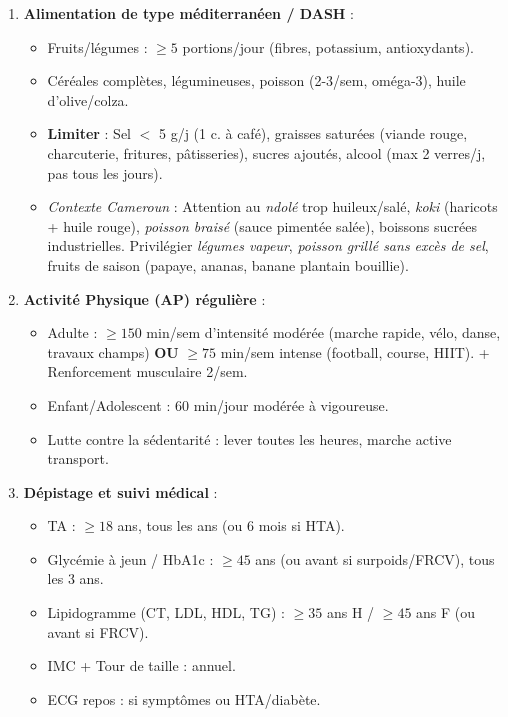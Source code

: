 \documentclass[11pt]{article}
\begin{document}
\begin{propriete}
\begin{enumerate}
    \item \textbf{Alimentation de type méditerranéen / DASH} :
    \begin{itemize}
        \item Fruits/légumes : $\ge 5$ portions/jour (fibres, potassium, antioxydants).
        \item Céréales complètes, légumineuses, poisson (2-3/sem, oméga-3), huile d'olive/colza.
        \item \textbf{Limiter} : Sel $<$ 5 g/j (1 c. à café), graisses saturées (viande rouge, charcuterie, fritures, pâtisseries), sucres ajoutés, alcool (max 2 verres/j, pas tous les jours).
        \item \emph{Contexte Cameroun} : Attention au \emph{ndolé} trop huileux/salé, \emph{koki} (haricots + huile rouge), \emph{poisson braisé} (sauce pimentée salée), boissons sucrées industrielles. Privilégier \emph{légumes vapeur}, \emph{poisson grillé sans excès de sel}, fruits de saison (papaye, ananas, banane plantain bouillie).
    \end{itemize}
    \item \textbf{Activité Physique (AP) régulière} :
    \begin{itemize}
        \item Adulte : $\ge 150$ min/sem d'intensité modérée (marche rapide, vélo, danse, travaux champs) \textbf{OU} $\ge 75$ min/sem intense (football, course, HIIT). + Renforcement musculaire 2/sem.
        \item Enfant/Adolescent : 60 min/jour modérée à vigoureuse.
        \item Lutte contre la sédentarité : lever toutes les heures, marche active transport.
    \end{itemize}
    \item \textbf{Dépistage et suivi médical} :
    \begin{itemize}
        \item TA : $\ge 18$ ans, tous les ans (ou 6 mois si HTA).
        \item Glycémie à jeun / HbA1c : $\ge 45$ ans (ou avant si surpoids/FRCV), tous les 3 ans.
        \item Lipidogramme (CT, LDL, HDL, TG) : $\ge 35$ ans H / $\ge 45$ ans F (ou avant si FRCV).
        \item IMC + Tour de taille : annuel.
        \item ECG repos : si symptômes ou HTA/diabète.
    \end{itemize}
\end{enumerate}
\end{propriete}
\end{document}
